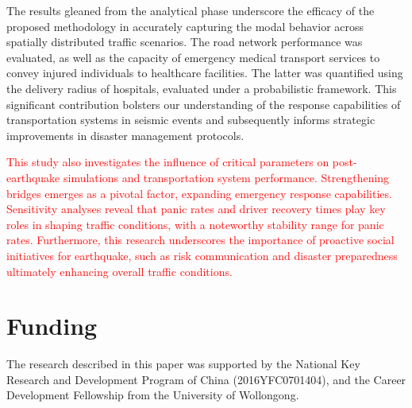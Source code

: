 \documentclass[review,11pt,nonatbib]{elsarticle}
\begin{document}
The results gleaned from the analytical phase underscore the efficacy of the proposed methodology in accurately capturing the modal behavior across spatially distributed traffic scenarios. The road network performance was evaluated, as well as the capacity of emergency medical transport services to convey injured individuals to healthcare facilities. The latter was quantified using the delivery radius of hospitals, evaluated under a probabilistic framework. This significant contribution bolsters our understanding of the response capabilities of transportation systems in seismic events and subsequently informs strategic improvements in disaster management protocols.


\textcolor{red}{
This study also investigates the influence of critical parameters on post-earthquake simulations and transportation system performance. Strengthening bridges emerges as a pivotal factor, expanding emergency response capabilities. Sensitivity analyses reveal that panic rates and driver recovery times play key roles in shaping traffic conditions, with a noteworthy stability range for panic rates. Furthermore, this research underscores the importance of proactive social initiatives for earthquake, such as risk communication and disaster preparedness ultimately enhancing overall traffic conditions.}

\section*{Funding}
The research described in this paper was supported by the National Key Research and Development Program of China (2016YFC0701404), and the Career Development Fellowship from the University of Wollongong. %

\printbibliography
\end{document}
